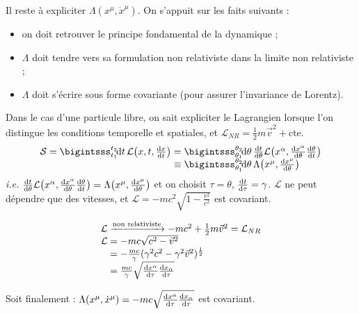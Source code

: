 Il reste à expliciter $\Lambda(x^\mu,\dot{x}^\mu)$. On s'appuit sur les faits suivants :
\begin{itemize}
	\item on doit retrouver le principe fondamental de la dynamique ;
	\item $\Lambda$ doit tendre vers sa formulation non relativiste dans la limite non relativiste ;
	\item $\Lambda$ doit s'écrire sous forme covariante (pour assurer l'invariance de Lorentz). 
\end{itemize}

{\txt Dans le cas d'une particule libre, on sait expliciter le Lagrangien lorsque l'on distingue les conditions temporelle et spatiales, et $\mathcal{L}_{NR}=\frac{1}{2}m\vec{v}^2+\mathrm{cte}$.}
$$
	\begin{array}{r@{\;}l}
		\mathcal{S}=\bigintsss_{t_1}^{t_2} \! \dif t\,\mathcal{L}\!\left(x,t,\frac{\dif x}{\dif t}\right) &= \bigintsss_{\theta_1}^{\theta_2} \!\dif \theta\,\frac{\dif t}{\dif\theta}\mathcal{L}\!\left(x^{\alpha},\frac{\dif x^{\alpha}}{\dif \theta}\frac{\dif\theta}{\dif t}\right)\\
		&\equiv  \bigintsss_{\theta_1}^{\theta_2} \!\dif \theta\,\Lambda\!\left(x^{\mu},\frac{\dif x^{\mu}}{\dif \theta}\right)
	\end{array}
$$
\emph{i.e.} $\frac{\mathrm{d} t}{\mathrm{d}\theta}\mathcal{L}\!\left(x^{\alpha},\frac{\mathrm{d} x^{\alpha}}{\mathrm{d} \theta}\frac{\mathrm{d}\theta}{\mathrm{d} t}\right) =\Lambda\!\left(x^{\mu},\frac{\mathrm{d} x^{\mu}}{\mathrm{d} \theta}\right)$ et on choisit $\tau=\theta$, $\frac{\mathrm{d} t}{\mathrm{d} \tau}=\gamma$.
$\mathcal{L}$ ne peut dépendre que des vitesses, et $\mathcal{L}=-mc^2\sqrt{1-\frac{v^2}{c^2}}$ est covariant.

$$
	\begin{array}{r@{\;}l}
		\mathcal{L}&\xrightarrow{\text{non relativiste}}-mc^2+\frac{1}{2}m\vec{v}^2=\mathcal{L}_{NR}\\
		\mathcal{L}&=-mc\sqrt{c^2-\vec{v}^2}\\
			&=-\frac{mc}{\gamma}(\gamma^2c^2-\gamma^2\vec{v}^2)^{\frac{1}{2}}\\
			&=\frac{mc}{\gamma}\sqrt{\frac{\dif x^{\alpha}}{\dif\tau}\frac{\dif x_{\alpha}}{\dif\tau}}
	\end{array}$$

Soit finalement : $\Lambda(x^\mu,\dot{x}^\mu)=-mc\sqrt{\frac{\mathrm{d} x^{\alpha}}{\mathrm{d}\tau}\frac{\mathrm{d} x_{\alpha}}{\mathrm{d}\tau}}$ est covariant.

